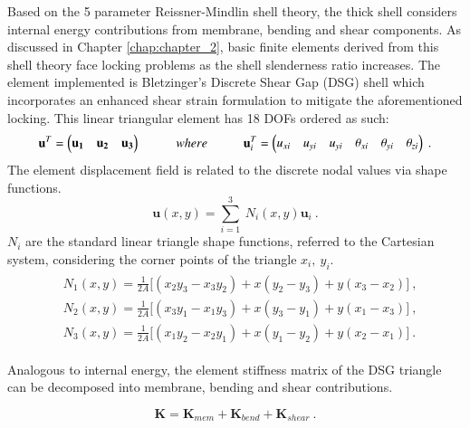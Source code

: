 Based on the 5 parameter Reissner-Mindlin shell theory, the thick shell considers internal energy contributions from membrane, bending and shear components. As discussed in Chapter \ref{chap:chapter_2}, basic finite elements derived from this shell theory face locking problems as the shell slenderness ratio increases. The element implemented is Bletzinger's Discrete Shear Gap (DSG) shell \cite{Ble00} which incorporates an enhanced shear strain formulation to mitigate the aforementioned locking. This linear triangular element has 18 DOFs ordered as such:
\begin{equation} 
\mathbf{u}^T = 
\begin{pmatrix}
\mathbf{u_1} & \mathbf{u_2} & \mathbf{u_3}
\end{pmatrix} 
\hspace{10mm}
where
\hspace{10mm}
\mathbf{u}_i^T = 
\begin{pmatrix}
{u_{xi}} & {u_{yi}} & {u_{yi}} & {\theta_{xi}} & {\theta_{yi}} & {\theta_{zi}}
\end{pmatrix}
\label{eqt1}\ .
\end{equation}
The element displacement field is related to the discrete nodal values via shape functions.
\begin{equation} 
\mathbf{u}(x, y) = \sum_{i=1}^3 \ N_i(x,y) \mathbf{u}_i
\label{eqt2}\ .
\end{equation}
$N_i$ are the standard linear triangle shape functions, referred to the Cartesian system, considering the corner points of the triangle $x_i,\ y_i$.
\begin{gather} 
	\begin{aligned}
		&N_1 (x , y) = \frac{1}{2 A} \big[ (x_2 y_3 - x_3 y_2) + x(y_2 - y_3) + y(x_3 - x_2) \big]\ ,
		\\
		&N_2 (x , y) = \frac{1}{2 A} \big[ (x_3 y_1 - x_1 y_3) + x(y_3 - y_1) + y(x_1 - x_3) \big]\ ,
		\\
		&N_3 (x , y) = \frac{1}{2 A} \big[ (x_1 y_2 - x_2 y_1) + x(y_1 - y_2) + y(x_2 - x_1) \big]
		\label{eqt3}\ .
	\end{aligned}
\end{gather}

Analogous to internal energy, the element stiffness matrix of the DSG triangle can be decomposed into membrane, bending and shear contributions.

\begin{equation} 
\mathbf{K} = \mathbf{K}_{mem} + \mathbf{K}_{bend} + \mathbf{K}_{shear}
\label{eqt4}\ .
\end{equation}

